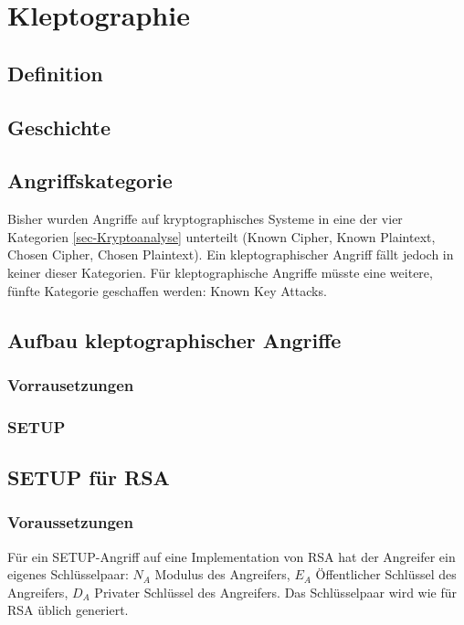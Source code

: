 \chapter{Kleptographie}
    \section{Definition}


    \section{Geschichte}

    \section{Angriffskategorie}
        Bisher wurden Angriffe auf kryptographisches Systeme in eine der vier Kategorien \ref{sec-Kryptoanalyse} unterteilt (Known Cipher, Known Plaintext, Chosen Cipher, Chosen Plaintext). Ein kleptographischer Angriff fällt jedoch in keiner dieser Kategorien. Für kleptographische Angriffe müsste eine weitere, fünfte Kategorie geschaffen werden: Known Key Attacks. 

    \section{Aufbau kleptographischer Angriffe}
    

        \subsection{Vorrausetzungen}


        \subsection{SETUP}

    \section{SETUP für RSA}
        \subsection{Voraussetzungen}
            Für ein \ac{SETUP}-Angriff auf eine Implementation von \ac{RSA} hat der Angreifer ein eigenes Schlüsselpaar: $N_{A}$ Modulus des Angreifers, $E_{A}$ Öffentlicher Schlüssel des Angreifers, $D_{A}$ Privater Schlüssel des Angreifers. Das Schlüsselpaar wird wie für \ac{RSA} üblich generiert.
        
